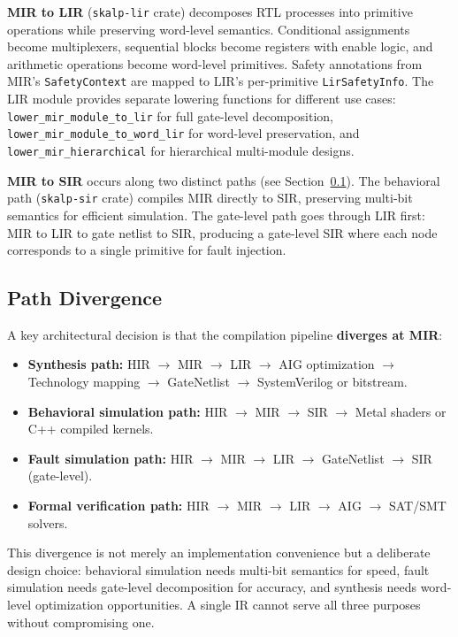 \documentclass[conference]{IEEEtran}
\begin{document}
\textbf{MIR to LIR} (\texttt{skalp-lir} crate) decomposes RTL processes into primitive operations while preserving word-level semantics. Conditional assignments become multiplexers, sequential blocks become registers with enable logic, and arithmetic operations become word-level primitives. Safety annotations from MIR's \texttt{SafetyContext} are mapped to LIR's per-primitive \texttt{LirSafetyInfo}. The LIR module provides separate lowering functions for different use cases: \texttt{lower\_mir\_module\_to\_lir} for full gate-level decomposition, \texttt{lower\_mir\_module\_to\_word\_lir} for word-level preservation, and \texttt{lower\_mir\_hierarchical} for hierarchical multi-module designs.

\textbf{MIR to SIR} occurs along two distinct paths (see Section~\ref{sec:divergence}). The behavioral path (\texttt{skalp-sir} crate) compiles MIR directly to SIR, preserving multi-bit semantics for efficient simulation. The gate-level path goes through LIR first: MIR to LIR to gate netlist to SIR, producing a gate-level SIR where each node corresponds to a single primitive for fault injection.

\subsection{Path Divergence}
\label{sec:divergence}

A key architectural decision is that the compilation pipeline \textbf{diverges at MIR}:

\begin{itemize}
  \item \textbf{Synthesis path:} HIR $\rightarrow$ MIR $\rightarrow$ LIR $\rightarrow$ AIG optimization $\rightarrow$ Technology mapping $\rightarrow$ GateNetlist $\rightarrow$ SystemVerilog or bitstream.
  \item \textbf{Behavioral simulation path:} HIR $\rightarrow$ MIR $\rightarrow$ SIR $\rightarrow$ Metal shaders or C++ compiled kernels.
  \item \textbf{Fault simulation path:} HIR $\rightarrow$ MIR $\rightarrow$ LIR $\rightarrow$ GateNetlist $\rightarrow$ SIR (gate-level).
  \item \textbf{Formal verification path:} HIR $\rightarrow$ MIR $\rightarrow$ LIR $\rightarrow$ AIG $\rightarrow$ SAT/SMT solvers.
\end{itemize}

This divergence is not merely an implementation convenience but a deliberate design choice: behavioral simulation needs multi-bit semantics for speed, fault simulation needs gate-level decomposition for accuracy, and synthesis needs word-level optimization opportunities. A single IR cannot serve all three purposes without compromising one.
\end{document}

